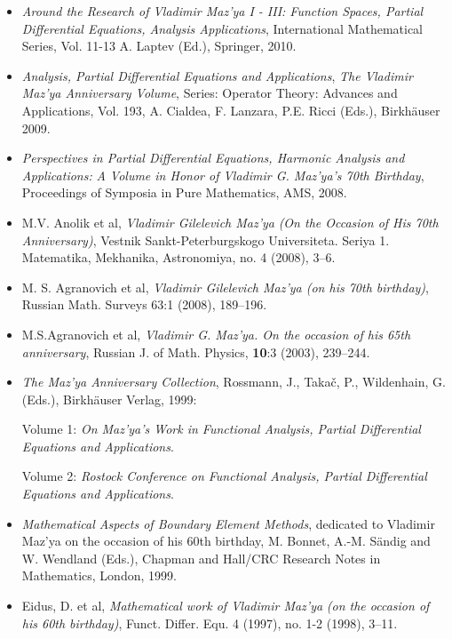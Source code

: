 \documentclass{article}
\begin{document}
\begin{itemize}
\item {\it Around the Research of Vladimir Maz'ya I - III: Function Spaces, Partial Differential Equations, Analysis Applications}, International Mathematical Series, Vol. 11-13 A. Laptev (Ed.), Springer, 2010. 
\item  {\it Analysis, Partial Differential Equations and Applications}, 
       {{\it The Vladimir Maz'ya Anniversary Volume}}, 
   Series: Operator Theory: Advances and Applications, Vol. 193, A. Cialdea, F. Lanzara, P.E. Ricci (Eds.),  Birkh\"auser 2009.
 \item {\it Perspectives in Partial Differential Equations, Harmonic Analysis and Applications:}
      {{\it A Volume in Honor of Vladimir G. Maz'ya's 70th Birthday}}, 
          Proceedings of Symposia in Pure Mathematics, AMS, 2008.
\item 
M.V. Anolik et al,  
     {{\it Vladimir Gilelevich Maz'ya}}
{\it (On the Occasion of His 70th Anniversary)}, 
Vestnik Sankt-Peterburgskogo Universiteta. Seriya 1. Matematika, Mekhanika, Astronomiya,  no. 4 (2008),   3--6.
\item  M. S. Agranovich et al,  {\it Vladimir Gilelevich Maz'ya (on his 70th birthday)}, Russian Math. Surveys 63:1 (2008),  189--196. 
\item M.S.Agranovich et al,
     {{\it Vladimir G. Maz'ya. On the occasion of his 65th anniversary}}, 
     Russian J. of Math. Physics, 
{\bf 10}:3 (2003), 239--244. 
         \item 
                  {\it The Maz'ya Anniversary Collection},  Rossmann, J., 
  Taka{\v c}, P., Wildenhain, G. (Eds.),  Birkh{\"a}user 
  Verlag, 1999:
          
           Volume 1: {\it On Maz'ya's Work
in Functional Analysis, 
  Partial Differential Equations and Applications}.
             
             Volume 2: {\it Rostock Conference
on Functional Analysis, 
  Partial Differential Equations and Applications}.
\item  
            {\it Mathematical Aspects of Boundary Element Methods}, dedicated to 
  Vladimir Maz'ya on the occasion of his 60th birthday,  M. 
  Bonnet, A.-M. S{\"a}ndig and
W. Wendland (Eds.), Chapman and 
  Hall/CRC Research Notes in Mathematics, London, 1999.
      \item Eidus, D. et al, 
       {{\it Mathematical work of Vladimir Maz'ya}} 
  {\it  (on the occasion of his 60th birthday)}, Funct. Differ. Equ. 4 
  (1997), no. 1-2 (1998), 3--11.
\end{itemize}
  
\end{document}
